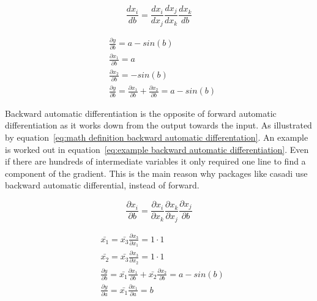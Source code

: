 \begin{equation}
	\frac{dx_i}{db} = \frac{dx_i}{dx_j}\frac{dx_j}{dx_k}\frac{dx_k}{db}
	\label{eq:math definition forward automatic differentation}
\end{equation}

\begin{equation}
	\begin{aligned}
		& \frac{\partial y}{\partial b} = a - sin(b) \\
		& \frac{\partial x_1}{\partial b} = a  \\
		& \frac{\partial x_2}{\partial b} = -sin(b) \\
		& \frac{\partial y}{\partial b} = \frac{\partial x_1}{\partial b} + \frac{\partial x_2}{\partial b}	 = a - sin(b)
	\end{aligned}
	\label{eq:example forward automatic differentiation}
\end{equation}

Backward automatic differentiation is the opposite of forward automatic differentiation as it works down from the output towards the input. As illustrated by equation~\ref{eq:math definition backward automatic differentation}. An example is worked out in equation~\ref{eq:example backward automatic differentiation}. Even if there are hundreds of intermediate variables it only required one line to find a component of the gradient. This is the main reason why packages like casadi use backward automatic differential, instead of forward.

\begin{equation}
	\frac{\partial x_i}{\partial b} = \frac{\partial x_i}{\partial x_k}\frac{\partial x_k}{\partial x_j}\frac{\partial x_j}{\partial b}
	\label{eq:math definition backward automatic differentation}
\end{equation}

\begin{equation}
\begin{aligned}
& \bar{x_1} = \bar{x_3} \frac{\partial x_3}{\partial x_1} = 1 \cdot 1 \\
& \bar{x_2} = \bar{x_3} \frac{\partial x_3}{\partial x_2} = 1 \cdot 1 \\
& \frac{\partial y}{\partial b} = \bar{x_1} \frac{\partial x_1}{\partial b} + \bar{x_2} \frac{\partial x_2}{\partial b} = a - sin(b)\\
& \frac{\partial y}{\partial a} = \bar{x_1} \frac{\partial x_1}{\partial a} = b
\end{aligned}
\label{eq:example backward automatic differentiation}
\end{equation}

